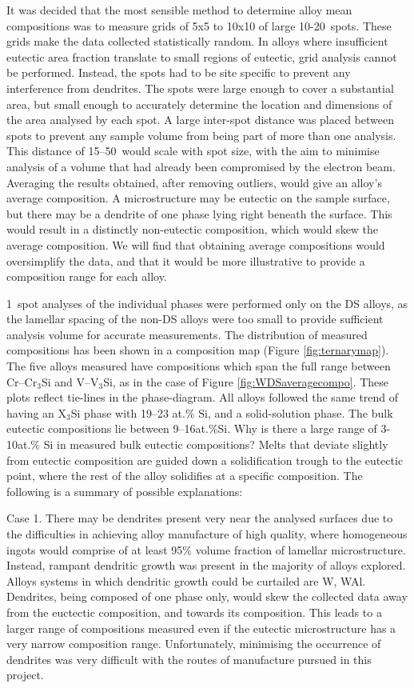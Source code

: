 It was decided that the most sensible method to determine alloy mean compositions was to measure grids of 5x5 to 10x10 of large 10-20\micro\metre\ spots.  These grids make the data collected statistically random.  In alloys where insufficient eutectic area fraction translate to small regions of eutectic, grid analysis cannot be performed.  Instead, the spots had to be site specific to prevent any interference from dendrites.  The spots were large enough to cover a substantial area, but small enough to accurately determine the location and dimensions of the area analysed by each spot.  A large inter-spot distance was placed between spots to prevent any sample volume from being part of more than one analysis.  This distance of 15--50\micro\metre\ would scale with spot size, with the aim to minimise analysis of a volume that had already been compromised by the electron beam.  Averaging the results obtained, after removing outliers, would give an alloy’s average composition.  A microstructure may be eutectic on the sample surface, but there may be a dendrite of one phase lying right beneath the surface.  This would result in a distinctly non-eutectic composition, which would skew the average composition.  We will find that obtaining average compositions would oversimplify the data, and that it would be more illustrative to provide a composition range for each alloy. 

1\micro\metre\ spot analyses of the individual phases were performed only on the DS alloys, as the lamellar spacing of the non-DS alloys were too small to provide sufficient analysis volume for accurate measurements.  
The distribution of measured compositions has been shown in a composition map (Figure \ref{fig:ternarymap}).  The five alloys measured have compositions which span the full range between Cr--Cr$_3$Si and V--V$_3$Si, as in the case of Figure \ref{fig:WDSaveragecompo}.  These plots reflect tie-lines in the phase-diagram.  All alloys followed the same trend of having an X$_3$Si phase with 19--23 at.\% Si, and a solid-solution phase. The bulk eutectic compositions lie between 9--16at.\%Si.  
Why is there a large range of 3-10at.\% Si in measured bulk eutectic compositions? Melts that deviate slightly from eutectic composition are guided down a solidification trough to the eutectic point, where the rest of the alloy solidifies at a specific composition.  The following is a summary of possible explanations:

Case 1.
There may be dendrites present very near the analysed surfaces due to the difficulties in achieving alloy manufacture of high quality, where homogeneous ingots would comprise of at least 95\% volume fraction of lamellar microstructure.  Instead, rampant dendritic growth was present in the majority of alloys explored.  Alloys systems in which dendritic growth could be curtailed are W, WAl.  Dendrites, being composed of one phase only, would skew the collected data away from the euctectic composition, and towards its composition.  This leads to a larger range of compositions measured even if the eutectic microstructure has a very narrow composition range.  Unfortunately, minimising the occurrence of dendrites was very difficult with the routes of manufacture pursued in this project.

